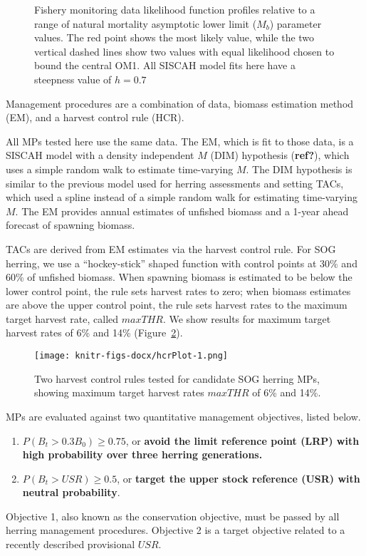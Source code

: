 \documentclass[11pt]{book}
\begin{document}
\begin{figure}
 \caption{Fishery monitoring data likelihood function profiles relative to a range of natural mortality asymptotic lower limit ($M_b$) parameter values. The red point shows the most likely value, while the two vertical dashed lines show two values with equal likelihood chosen to bound the central OM1. All SISCAH model fits here have a steepness value of $h = 0.7$}\label{fig:LPfig}
\end{figure}
\hypertarget{management-procedures}{%
\label{management-procedures}}

Management procedures are a combination of data, biomass estimation method (EM), and a harvest control rule (HCR).

All MPs tested here use the same data. The EM, which is fit to those data, is a SISCAH model with a density independent \(M\) (DIM) hypothesis (\textbf{ref?}), which uses a simple random walk to estimate time-varying \(M\). The DIM hypothesis is similar to the previous model used for herring assessments and setting TACs, which used a spline instead of a simple random walk for estimating time-varying \(M\). The EM provides annual estimates of unfished biomass and a 1-year ahead forecast of spawning biomass.

TACs are derived from EM estimates via the harvest control rule. For SOG herring, we use a ``hockey-stick'' shaped function with control points at 30\% and 60\% of unfished biomass. When spawning biomass is estimated to be below the lower control point, the rule sets harvest rates to zero; when biomass estimates are above the upper control point, the rule sets harvest rates to the maximum target harvest rate, called \(maxTHR\). We show results for maximum target harvest rates of 6\% and 14\% (Figure~\ref{fig:hcrPlot}).
\begin{figure}
\centering
\texttt{[image: knitr-figs-docx/hcrPlot-1.png]}
\caption{\label{fig:hcrPlot}Two harvest control rules tested for candidate SOG herring MPs, showing maximum target harvest rates \(maxTHR\) of 6\% and 14\%.}
\end{figure}
\hypertarget{performance-metrics}{%
\label{performance-metrics}}

MPs are evaluated against two quantitative management objectives, listed below.
\begin{enumerate}
\def\labelenumi{\arabic{enumi}.}
\item
  \(P(B_t > 0.3 B_0) \geq 0.75\), or \textbf{avoid the limit reference point (LRP) with high probability over three herring generations.}
\item
  \(P(B_t > USR) \geq 0.5\), or \textbf{target the upper stock reference (USR) with neutral probability}.
\end{enumerate}
Objective 1, also known as the conservation objective, must be passed by all herring management procedures. Objective 2 is a target objective related to a recently described provisional \(USR\).
\end{document}

